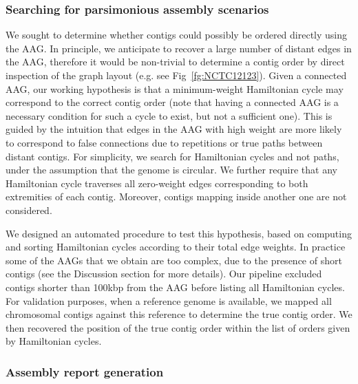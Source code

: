 \documentclass[./main.tex]{subfiles}
\newcommand{\modafterreview}[1]{#1}
\begin{document}
\subsubsection{Searching for parsimonious assembly scenarios \label{sec:hamiltonian}}

We sought to determine whether contigs could possibly be ordered directly using the AAG. 
In principle, we anticipate to recover a large number of distant edges in the AAG, %
therefore it would be non-trivial to determine a contig order by direct inspection of the graph layout (e.g. see Fig~\ref{fg:NCTC12123}). 
Given a connected AAG, our working hypothesis is that a minimum-weight Hamiltonian cycle may correspond to the correct contig order \modafterreview{(note that having a connected AAG is a necessary condition for such a cycle to exist, but not a sufficient one)}. This is guided by the intuition %
that edges in the AAG with high weight are more likely to correspond to false connections due to repetitions or true paths between distant contigs.
For simplicity, we search for Hamiltonian cycles and not paths, under the assumption that the genome is circular. We further require that any Hamiltonian cycle traverses all zero-weight edges corresponding to both extremities of each contig. \modafterreview{Moreover, contigs mapping inside another one are not considered.} 

We designed an automated procedure to test this hypothesis, based on computing and sorting Hamiltonian cycles according to their total edge weights. %
In practice some of the AAGs that we obtain are too complex, due to the presence of short contigs (see the Discussion section for more details). \modafterreview{Our pipeline} %
excluded contigs shorter than 100kbp from the \modafterreview{AAG} before listing all Hamiltonian cycles. 
For validation purposes, when a reference genome is available, we mapped all chromosomal contigs against this reference to determine the true contig order. We then recovered the position of the true \modafterreview{contig} order within the list of %
orders given by Hamiltonian cycles.

\subsubsection{Assembly report generation}
\end{document}
